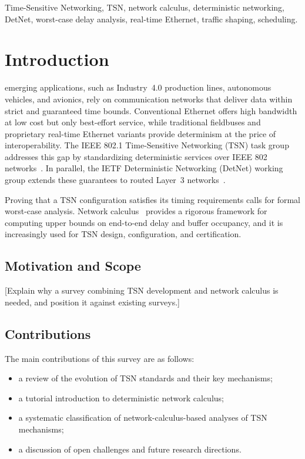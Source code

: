 \documentclass[journal]{IEEEtran}
\begin{document}
\begin{IEEEkeywords}
Time-Sensitive Networking, TSN, network calculus, deterministic networking, DetNet, worst-case delay analysis, real-time Ethernet, traffic shaping, scheduling.
\end{IEEEkeywords}

\IEEEpeerreviewmaketitle


\section{Introduction}
 emerging applications, such as Industry~4.0 production lines, autonomous vehicles, and avionics, rely on communication networks that deliver data within strict and guaranteed time bounds. Conventional Ethernet offers high bandwidth at low cost but only best-effort service, while traditional fieldbuses and proprietary real-time Ethernet variants provide determinism at the price of interoperability. The IEEE 802.1 Time-Sensitive Networking (TSN) task group addresses this gap by standardizing deterministic services over IEEE 802 networks~\cite{nasrallah2019ull}. In parallel, the IETF Deterministic Networking (DetNet) working group extends these guarantees to routed Layer~3 networks~\cite{rfc8655}.

Proving that a TSN configuration satisfies its timing requirements calls for formal worst-case analysis. Network calculus~\cite{cruz1991calculus, leboudec2001network, bouillard2018deterministic} provides a rigorous framework for computing upper bounds on end-to-end delay and buffer occupancy, and it is increasingly used for TSN design, configuration, and certification.

\subsection{Motivation and Scope}
[Explain why a survey combining TSN development and network calculus is needed, and position it against existing surveys.]

\subsection{Contributions}
The main contributions of this survey are as follows:
\begin{itemize}
\item a review of the evolution of TSN standards and their key mechanisms;
\item a tutorial introduction to deterministic network calculus;
\item a systematic classification of network-calculus-based analyses of TSN mechanisms;
\item a discussion of open challenges and future research directions.
\end{itemize}
\end{document}
